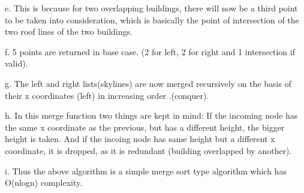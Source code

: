 \documentclass{article}
\begin{document}
e. This is because for two overlapping buildings, there will now be
a third point to be taken into consideration, which is basically the
point of intersection of the two roof lines of the two buildings.

f. 5 points are returned in base case. (2 for left, 2 for right and
1 intersection if valid).

g. The left and right lists(skylines) are now merged recursively on
the basis of their x coordinates (left) in increasing order .(conquer).

h. In this merge function two things are kept in mind: If the incoming
node has the same x coordinate as the previous, but has a different
height, the bigger height is taken. And if the incoing node has same
height but a different x coordinate, it is dropped, as it is redundant
(building overlapped by another). 

i. Thus the above algorithm is a simple merge sort type algorithm
which has O(nlogn) complexity.
\end{document}
